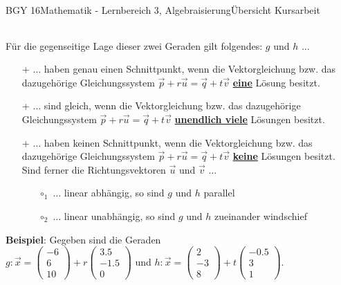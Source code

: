 \documentclass[oneside,openany,headings=optiontotoc,11pt,numbers=noenddot]{scrreprt}
\begin{document}
\begin{worksheet}{BGY 16}{Mathematik - Lernbereich 3, Algebraisierung}{Übersicht Kursarbeit}
\begin{framed}
\begin{center}
\begin{tabularx}{\textwidth}{XlX}
				\end{tabularx}
			\end{center}
			Für die gegenseitige Lage dieser zwei Geraden gilt folgendes: \(g\) und \(h\) \(\ldots\)
			\begin{framed}
				\noindent
				\begin{itemize}
					\item[+] \(\ldots\) haben \color{codegreen}genau einen\normalcolor{} Schnittpunkt, wenn die Vektorgleichung bzw. das dazugehörige Gleichungssystem \(\vec{p} + r\vec{u} = \vec{q} + t\vec{v}\) \underline{\textbf{eine}} Lösung besitzt. 
					\item[+] \(\ldots\) sind \color{codegreen}gleich\normalcolor{}, wenn die Vektorgleichung bzw. das dazugehörige Gleichungssystem \(\vec{p} + r\vec{u} = \vec{q} + t\vec{v}\) \underline{\textbf{unendlich viele}} Lösungen besitzt.
				\end{itemize}
			\end{framed}
			\begin{framed}
				\begin{itemize}
					\item[+] \(\ldots\) haben \color{red}keinen\normalcolor{} Schnittpunkt, wenn die Vektorgleichung bzw. das dazugehörige Gleichungssystem \(\vec{p} + r\vec{u} = \vec{q} + t\vec{v}\) \underline{\textbf{keine}} Lösungen besitzt.\\
					Sind ferner die Richtungsvektoren \(\vec{u}\) und \(\vec{v}\) \(\ldots\)
					\begin{itemize}
						\item[\(\circ_1\)] \(\ldots\) linear \color{blue}abhängig\normalcolor{}, so sind \(g\) und \(h\) \color{red}parallel\normalcolor{}
						\item[\(\circ_2\)] \(\ldots\) linear \color{blue}unabhängig\normalcolor{}, so sind \(g\) und \(h\) zueinander \color{red}windschief\normalcolor{}
					\end{itemize}
				\end{itemize}
			\end{framed}
			\noindent
			\textbf{Beispiel}: Gegeben sind die Geraden\\ \(g: \vec{x} = \left(\begin{array}{c}-6\\6\\10\end{array}\right) + r\left(\begin{array}{c}3.5\\-1.5\\0\end{array}\right)\) und \(h: \vec{x} = \left(\begin{array}{c}2\\-3\\8\end{array}\right) + t\left(\begin{array}{c}-0.5\\3\\1\end{array}\right)\).\\

\end{framed}
\end{worksheet}
\end{document}
